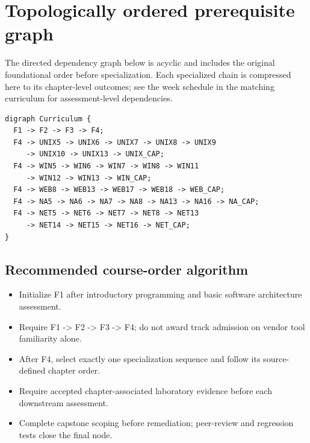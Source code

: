 \documentclass[10pt,letterpaper]{article}
\begin{document}
\section{Topologically ordered prerequisite graph}
The directed dependency graph below is acyclic and includes the original foundational order before specialization. Each specialized chain is compressed here to its chapter-level outcomes; see the week schedule in the matching curriculum for assessment-level dependencies.

\begin{lstlisting}
digraph Curriculum {
  F1 -> F2 -> F3 -> F4;
  F4 -> UNIX5 -> UNIX6 -> UNIX7 -> UNIX8 -> UNIX9
     -> UNIX10 -> UNIX13 -> UNIX_CAP;
  F4 -> WIN5 -> WIN6 -> WIN7 -> WIN8 -> WIN11
     -> WIN12 -> WIN13 -> WIN_CAP;
  F4 -> WEB8 -> WEB13 -> WEB17 -> WEB18 -> WEB_CAP;
  F4 -> NA5 -> NA6 -> NA7 -> NA8 -> NA13 -> NA16 -> NA_CAP;
  F4 -> NET5 -> NET6 -> NET7 -> NET8 -> NET13
     -> NET14 -> NET15 -> NET16 -> NET_CAP;
}
\end{lstlisting}
\subsection{Recommended course-order algorithm}
\begin{itemize}[leftmargin=*,itemsep=2pt]
\item Initialize F1 after introductory programming and basic software architecture assessment.
\item Require F1 -> F2 -> F3 -> F4; do not award track admission on vendor tool familiarity alone.
\item After F4, select exactly one specialization sequence and follow its source-defined chapter order.
\item Require accepted chapter-associated laboratory evidence before each downstream assessment.
\item Complete capstone scoping before remediation; peer-review and regression tests close the final node.
\end{itemize}
\end{document}
